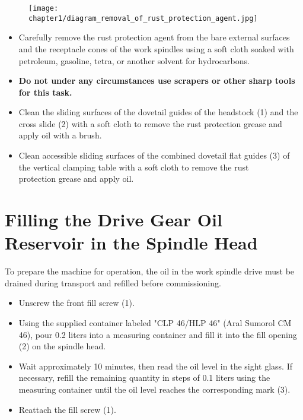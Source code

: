\begin{figure}[h]
    \centering
    \texttt{[image: chapter1/diagram\_removal\_of\_rust\_protection\_agent.jpg]}
    \caption{}
\end{figure}

\begin{itemize}
    \item Carefully remove the rust protection agent from the bare external surfaces and the receptacle cones of the work spindles using a soft cloth soaked with petroleum, gasoline, tetra, or another solvent for hydrocarbons.
    \item \textbf{Do not under any circumstances use scrapers or other sharp tools for this task.}
    \item Clean the sliding surfaces of the dovetail guides of the headstock (1) and the cross slide (2) with a soft cloth to remove the rust protection grease and apply oil with a brush.\footnotemark[2]
    \item Clean accessible sliding surfaces of the combined dovetail flat guides (3) of the vertical clamping table with a soft cloth to remove the rust\\ protection grease and apply oil.
\end{itemize}



\section{Filling the Drive Gear Oil Reservoir in the Spindle Head}

To prepare the machine for operation, the oil in the work spindle drive must be drained during transport and refilled before commissioning.

\vspace{.5cm}



\begin{itemize}[itemsep=0.5em]
    \item Unscrew the front fill screw (1).
    \item Using the supplied container labeled "CLP 46/HLP 46" (Aral Sumorol CM 46), pour 0.2 liters into a measuring container and fill it into the fill opening (2) on the spindle head.
    \item Wait approximately 10 minutes, then read the oil level in the sight glass. If necessary, refill the remaining quantity in steps of 0.1 liters using the measuring container until the oil level reaches the corresponding mark (3).
    \item Reattach the fill screw (1).
\end{itemize}


